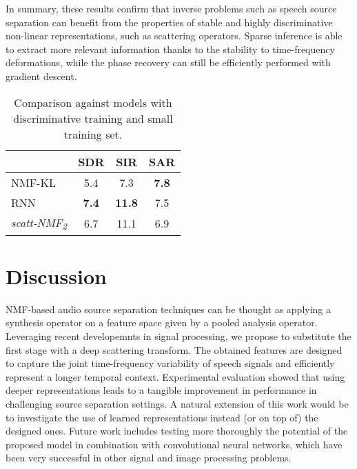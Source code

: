 In summary, these results confirm that inverse problems such as speech source separation 
can benefit from the properties of stable and highly discriminative non-linear representations, 
such as scattering operators. Sparse inference is able to extract more relevant information thanks 
to the stability to time-frequency deformations, while the phase recovery can still be efficiently performed
with gradient descent.



\begin{table}[tb]
\caption{Comparison against models with discriminative training 
and small training set. \label{ta:eval2}}
\vspace{-4.5ex}
\begin{center}
\footnotesize{
\begin{tabular}{l|c|c|c}
  \hline\hline
& SDR & SIR & SAR \\
\hline
NMF-KL     & 5.4 &   7.3 & {\bf 7.8} \\
\hline
RNN \cite{Huang_DNN_Separation_ICASSP2014} & {\bf 7.4}  &   {\bf 11.8} & 7.5  \\
\hline
\emph{scatt-NMF\textsubscript{2}} &  6.7 & 11.1  & 6.9 \\
  \hline\hline
\end{tabular}
}
\end{center}
\vspace{-4.0ex}
\end{table}


\section{Discussion}
NMF-based audio source separation techniques can be thought as applying a synthesis operator on a feature space
given by a pooled analysis operator. Leveraging recent developemnts in signal processing, we propose to substitute
the first stage with a deep scattering transform. 
The obtained features are designed to capture the joint time-frequency variability of speech signals
and efficiently represent a longer temporal context. Experimental evaluation showed that using deeper representations
leads to a tangible improvement in performance in challenging source separation settings.
A natural extension of this work would be to investigate the use of learned representations instead (or on top of)
the designed ones.
%
Future work includes testing more thoroughly the potential of the proposed model in combination
with convolutional neural networks, which have been very successful in other signal and image processing problems.

